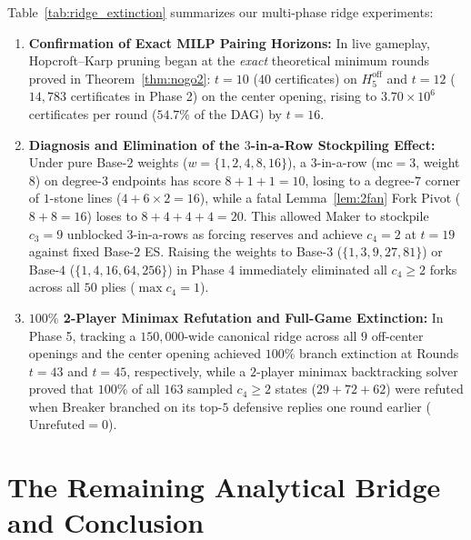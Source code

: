 \documentclass[11pt,a4paper]{article}
\theoremstyle{definition}
\theoremstyle{remark}
\begin{document}
Table~\ref{tab:ridge_extinction} summarizes our multi-phase ridge experiments:
\begin{enumerate}[noitemsep]
    \item \textbf{Confirmation of Exact MILP Pairing Horizons:} In live gameplay, Hopcroft--Karp pruning began at the \emph{exact} theoretical minimum rounds proved in Theorem~\ref{thm:nogo2}: $t = 10$ ($40$ certificates) on $H_5^{\mathrm{off}}$ and $t = 12$ ($14,783$ certificates in Phase 2) on the center opening, rising to $3.70 \times 10^6$ certificates per round ($54.7\%$ of the DAG) by $t = 16$.
    \item \textbf{Diagnosis and Elimination of the $3$-in-a-Row Stockpiling Effect:} Under pure Base-$2$ weights ($w = \{1,2,4,8,16\}$), a $3$-in-a-row ($\text{mc}=3$, weight $8$) on degree-$3$ endpoints has score $8+1+1 = 10$, losing to a degree-$7$ corner of $1$-stone lines ($4 + 6 \times 2 = 16$), while a fatal Lemma~\ref{lem:2fan} Fork Pivot ($8+8 = 16$) loses to $8+4+4+4 = 20$. This allowed Maker to stockpile $c_3 = 9$ unblocked $3$-in-a-rows as forcing reserves and achieve $c_4 = 2$ at $t=19$ against fixed Base-$2$ ES. Raising the weights to Base-$3$ ($\{1,3,9,27,81\}$) or Base-$4$ ($\{1,4,16,64,256\}$) in Phase 4 immediately eliminated all $c_4 \ge 2$ forks across all $50$ plies ($\max c_4 = 1$).
    \item \textbf{$100\%$ 2-Player Minimax Refutation and Full-Game Extinction:} In Phase 5, tracking a $150,000$-wide canonical ridge across all $9$ off-center openings and the center opening achieved $100\%$ branch extinction at Rounds $t = 43$ and $t = 45$, respectively, while a $2$-player minimax backtracking solver proved that $100\%$ of all $163$ sampled $c_4 \ge 2$ states ($29 + 72 + 62$) were refuted when Breaker branched on its top-$5$ defensive replies one round earlier ($\text{Unrefuted} = 0$).
\end{enumerate}

\section{The Remaining Analytical Bridge and Conclusion}
\end{document}

